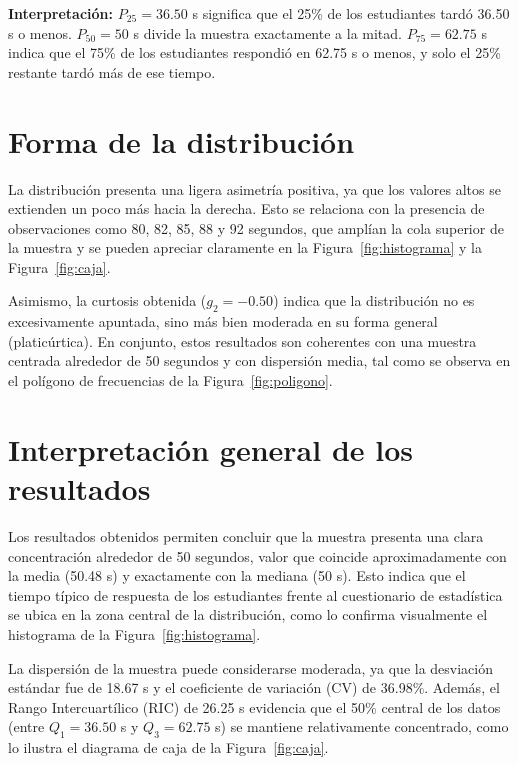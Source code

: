 \documentclass[12pt,letterpaper]{article}
\begin{document}
\textbf{Interpretación:} $P_{25} = 36.50$ s significa que el 25\% de los estudiantes tardó 36.50 s o menos. $P_{50} = 50$ s divide la muestra exactamente a la mitad. $P_{75} = 62.75$ s indica que el 75\% de los estudiantes respondió en 62.75 s o menos, y solo el 25\% restante tardó más de ese tiempo.

\section{Forma de la distribución}

La distribución presenta una ligera asimetría positiva, ya que los valores altos se extienden un poco más hacia la derecha. Esto se relaciona con la presencia de observaciones como 80, 82, 85, 88 y 92 segundos, que amplían la cola superior de la muestra y se pueden apreciar claramente en la Figura~\ref{fig:histograma} y la Figura~\ref{fig:caja}.

Asimismo, la curtosis obtenida ($g_2 = -0.50$) indica que la distribución no es excesivamente apuntada, sino más bien moderada en su forma general (platicúrtica). En conjunto, estos resultados son coherentes con una muestra centrada alrededor de 50 segundos y con dispersión media, tal como se observa en el polígono de frecuencias de la Figura~\ref{fig:poligono}.

\section{Interpretación general de los resultados}

Los resultados obtenidos permiten concluir que la muestra presenta una clara concentración alrededor de 50 segundos, valor que coincide aproximadamente con la media (50.48 s) y exactamente con la mediana (50 s). Esto indica que el tiempo típico de respuesta de los estudiantes frente al cuestionario de estadística se ubica en la zona central de la distribución, como lo confirma visualmente el histograma de la Figura~\ref{fig:histograma}.

La dispersión de la muestra puede considerarse moderada, ya que la desviación estándar fue de 18.67 s y el coeficiente de variación (CV) de 36.98\%. Además, el Rango Intercuartílico (RIC) de 26.25 s evidencia que el 50\% central de los datos (entre $Q_1 = 36.50$ s y $Q_3 = 62.75$ s) se mantiene relativamente concentrado, como lo ilustra el diagrama de caja de la Figura~\ref{fig:caja}.
\end{document}
